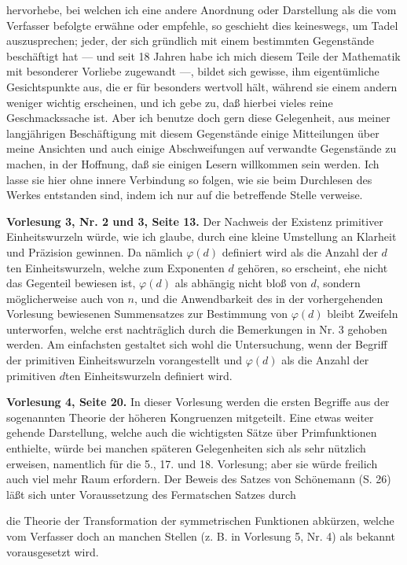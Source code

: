 \documentclass[11pt]{article}
\newcommand{\origpage}[1]{\par\vspace{0.25em}\noindent{\footnotesize\itshape [Gedruckte Seite #1]}\par\vspace{0.25em}}
\begin{document}
\origpage{411}
hervorhebe, bei welchen ich eine andere Anordnung oder Darstellung als die vom Verfasser befolgte erwähne oder empfehle, so geschieht dies keineswegs, um Tadel auszusprechen; jeder, der sich gründlich mit einem bestimmten Gegenstände beschäftigt hat --- und seit 18 Jahren habe ich mich diesem Teile der Mathematik mit besonderer Vorliebe zugewandt ---, bildet sich gewisse, ihm eigentümliche Gesichtspunkte aus, die er für besonders wertvoll hält, während sie einem andern weniger wichtig erscheinen, und ich gebe zu, daß hierbei vieles reine Geschmackssache ist. Aber ich benutze doch gern diese Gelegenheit, aus meiner langjährigen Beschäftigung mit diesem Gegenstände einige Mitteilungen über meine Ansichten und auch einige Abschweifungen auf verwandte Gegenstände zu machen, in der Hoffnung, daß sie einigen Lesern willkommen sein werden. Ich lasse sie hier ohne innere Verbindung so folgen, wie sie beim Durchlesen des Werkes entstanden sind, indem ich nur auf die betreffende Stelle verweise.

\textbf{Vorlesung 3, Nr. 2 und 3, Seite 13.} Der Nachweis der Existenz primitiver Einheitswurzeln würde, wie ich glaube, durch eine kleine Umstellung an Klarheit und Präzision gewinnen. Da nämlich $\varphi(d)$ definiert wird als die Anzahl der $d$ten Einheitswurzeln, welche zum Exponenten $d$ gehören, so erscheint, ehe nicht das Gegenteil bewiesen ist, $\varphi(d)$ als abhängig nicht bloß von $d$, sondern möglicherweise auch von $n$, und die Anwendbarkeit des in der vorhergehenden Vorlesung bewiesenen Summensatzes zur Bestimmung von $\varphi(d)$ bleibt Zweifeln unterworfen, welche erst nachträglich durch die Bemerkungen in Nr. 3 gehoben werden. Am einfachsten gestaltet sich wohl die Untersuchung, wenn der Begriff der primitiven Einheitswurzeln vorangestellt und $\varphi(d)$ als die Anzahl der primitiven $d$ten Einheitswurzeln definiert wird.

\textbf{Vorlesung 4, Seite 20.} In dieser Vorlesung werden die ersten Begriffe aus der sogenannten Theorie der höheren Kongruenzen mitgeteilt. Eine etwas weiter gehende Darstellung, welche auch die wichtigsten Sätze über Primfunktionen enthielte, würde bei manchen späteren Gelegenheiten sich als sehr nützlich erweisen, namentlich für die 5., 17. und 18. Vorlesung; aber sie würde freilich auch viel mehr Raum erfordern. Der Beweis des Satzes von Schönemann (S. 26) läßt sich unter Voraussetzung des Fermatschen Satzes durch

\origpage{412}
die Theorie der Transformation der symmetrischen Funktionen abkürzen, welche vom Verfasser doch an manchen Stellen (z. B. in Vorlesung 5, Nr. 4) als bekannt vorausgesetzt wird.
\end{document}
